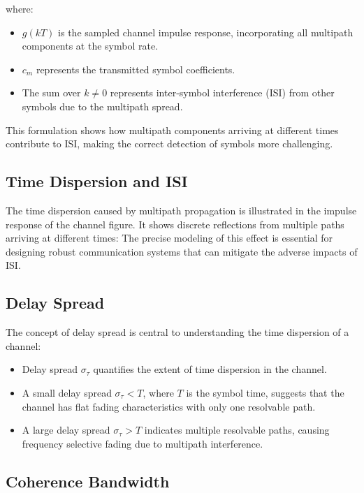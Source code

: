 where:
\begin{itemize}
    \item \( g(kT) \) is the sampled channel impulse response, incorporating all multipath components at the symbol rate.
    \item \( c_m \) represents the transmitted symbol coefficients.
    \item The sum over \( k \neq 0 \) represents inter-symbol interference (ISI) from other symbols due to the multipath spread.
\end{itemize}

This formulation shows how multipath components arriving at different times contribute to ISI, making the correct detection of symbols more challenging.

\subsection*{Time Dispersion and ISI}

The time dispersion caused by multipath propagation is illustrated in the impulse response of the channel figure. It shows discrete reflections from multiple paths arriving at different times:
The precise modeling of this effect is essential for designing robust communication systems that can mitigate the adverse impacts of ISI.


\subsection*{Delay Spread}

The concept of delay spread is central to understanding the time dispersion of a channel:

\begin{itemize}
    \item Delay spread \( \sigma_{\tau} \) quantifies the extent of time dispersion in the channel.
    \item A small delay spread \( \sigma_{\tau} < T \), where \( T \) is the symbol time, suggests that the channel has flat fading characteristics with only one resolvable path.
    \item A large delay spread \( \sigma_{\tau} > T \) indicates multiple resolvable paths, causing frequency selective fading due to multipath interference.
\end{itemize}

\subsection*{Coherence Bandwidth}


